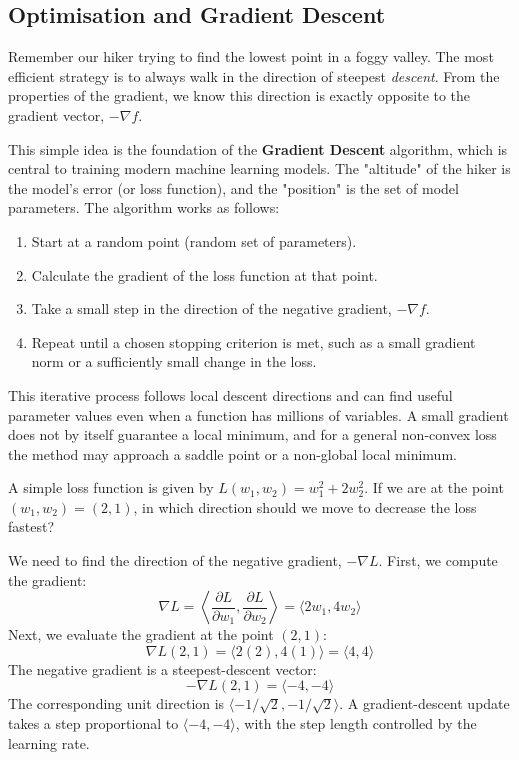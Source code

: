 \subsection*{Optimisation and Gradient Descent}
Remember our hiker trying to find the lowest point in a foggy valley. The most efficient strategy is to always walk in the direction of steepest \emph{descent}. From the properties of the gradient, we know this direction is exactly opposite to the gradient vector, \( -\nabla f \).

This simple idea is the foundation of the \textbf{Gradient Descent} algorithm, which is central to training modern machine learning models. The "altitude" of the hiker is the model's error (or loss function), and the "position" is the set of model parameters. The algorithm works as follows:

\vspace{1cm}

\begin{enumerate}
    \item Start at a random point (random set of parameters).
    \item Calculate the gradient of the loss function at that point.
    \item Take a small step in the direction of the negative gradient, \( -\nabla f \).
    \item Repeat until a chosen stopping criterion is met, such as a small gradient norm or a sufficiently small change in the loss.
\end{enumerate}

This iterative process follows local descent directions and can find useful parameter values even when a function has millions of variables. A small gradient does not by itself guarantee a local minimum, and for a general non-convex loss the method may approach a saddle point or a non-global local minimum.

\begin{example}

A simple loss function is given by \( L(w_1, w_2) = w_1^2 + 2w_2^2 \). If we are at the point \((w_1, w_2) = (2, 1)\), in which direction should we move to decrease the loss fastest?
\end{example}
\begin{solution}
We need to find the direction of the negative gradient, \( -\nabla L \).
First, we compute the gradient:
\[
\nabla L = \left\langle \frac{\partial L}{\partial w_1}, \frac{\partial L}{\partial w_2} \right\rangle = \langle 2w_1, 4w_2 \rangle
\]
Next, we evaluate the gradient at the point \((2, 1)\):
\[
\nabla L(2, 1) = \langle 2(2), 4(1) \rangle = \langle 4, 4 \rangle
\]
The negative gradient is a steepest-descent vector:
\[
-\nabla L(2, 1) = \langle -4, -4 \rangle
\]
The corresponding unit direction is $\langle-1/\sqrt{2},-1/\sqrt{2}\rangle$. A gradient-descent update takes a step proportional to $\langle-4,-4\rangle$, with the step length controlled by the learning rate.
\end{solution}

